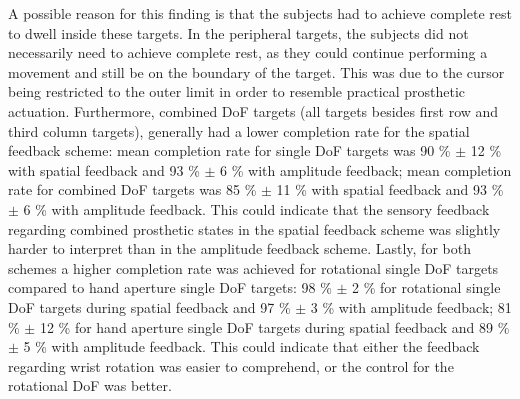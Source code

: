A possible reason for this finding is that the subjects had to achieve complete rest to dwell inside these targets. In the peripheral targets, the subjects did not necessarily need to achieve complete rest, as they could continue performing a movement and still be on the boundary of the target. This was due to the cursor being restricted to the outer limit in order to resemble practical prosthetic actuation.  
Furthermore, combined DoF targets (all targets besides first row and third column targets), generally had a lower completion rate for the spatial feedback scheme: mean completion rate for single DoF targets was 90 \% $\pm$ 12 \% with spatial feedback and 93 \% $\pm$ 6 \% with amplitude feedback; mean completion rate for combined DoF targets was 85 \% $\pm$ 11 \% with spatial feedback and 93 \% $\pm$ 6 \% with amplitude feedback. This could indicate that the sensory feedback regarding combined prosthetic states in the spatial feedback scheme was slightly harder to interpret than in the amplitude feedback scheme. 
Lastly, for both schemes a higher completion rate was achieved for rotational single DoF targets compared to hand aperture single DoF targets: 98 \% $\pm$ 2 \% for rotational single DoF targets during spatial feedback and 97 \% $\pm$ 3 \% with amplitude feedback; 81 \% $\pm$ 12 \% for hand aperture single DoF targets during spatial feedback and 89 \% $\pm$ 5 \% with amplitude feedback. This could indicate that either the feedback regarding wrist rotation was easier to comprehend, or the control for the rotational DoF was better.
